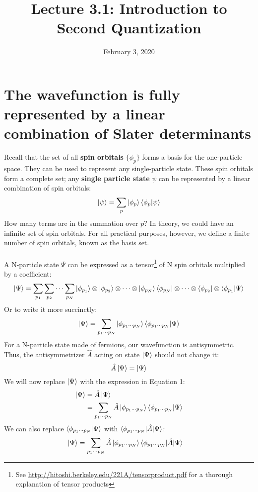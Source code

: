 \documentclass{article}
\title{Lecture 3.1: Introduction to Second Quantization}
\date{February 3, 2020}
\begin{document}
\maketitle
\noindent
\section{The wavefunction is fully represented by a linear combination of Slater determinants}
Recall that the set of all \textbf{spin orbitals} $\{\phi_p\}$ forms a basis for the one-particle space.
They can be used to represent any single-particle state.
These spin orbitals form a complete set; any \textbf{single particle state} $\psi$ can be represented by
a linear combination of spin orbitals:
\[\ket{\psi} = \sum_p \ket{\phi_p}\braket{\phi_p | \psi} \]
How many terms are in the summation over $p$? 
In theory, we could have an infinite set of spin orbitals.
For all practical purposes, however, we define a finite number of spin orbitals, known as the basis set. \\
\\
A N-particle state $\Psi$ can be expressed as a tensor\footnote{See \url{http://hitoshi.berkeley.edu/221A/tensorproduct.pdf} for a thorough explanation of tensor products} 
of N spin orbitals multiplied by a coefficient:
\[\ket{\Psi} = \sum_{p_1}\sum_{p_2}\cdots\sum_{p_N} \ket{\phi_{p_1}}\otimes \ket{\phi_{p_2}} \otimes \cdots \otimes \ket{\phi_{p_N}}  \bra{\phi_{p_N}}\otimes \cdots \otimes \bra{\phi_{p_2}} \otimes \braket{\phi_{p_1}  | \Psi} \]
Or to write it more succinctly: 
\begin{equation}
\ket{\Psi} = \sum_{p_1 \cdots p_N} \ket{\phi_{p_1 \cdots p_N}} \braket{\phi_{p_1 \cdots p_N} | \Psi} 
\end{equation}
For a N-particle state made of fermions, our wavefunction is antisymmetric.
Thus, the antisymmetrizer $\hat{A}$ acting on state $\ket{\Psi}$ should not change it: 
\[ \hat{A}\ket{\Psi} = \ket{\Psi} \]
We will now replace $\ket{\Psi}$ with the expression in Equation 1: 
\begin{align*}
\ket{\Psi} &=  \hat{A} \ket{\Psi}\\
&=\sum_{p_1 \cdots p_N}\hat{A} \ket{\phi_{p_1 \cdots p_N}} \braket{\phi_{p_1 \cdots p_N} | \Psi}  
\end{align*}
We can also replace $\braket{\phi_{p_1 \cdots p_N} | \Psi}$ with $\braket{\phi_{p_1 \cdots p_N} | \hat{A} | \Psi} $: 
\begin{align*}
\ket{\Psi} &=\sum_{p_1 \cdots p_N}\hat{A} \ket{\phi_{p_1 \cdots p_N}} \braket{\phi_{p_1 \cdots p_N} | \hat{A} | \Psi} 
\end{align*}
\end{document}
